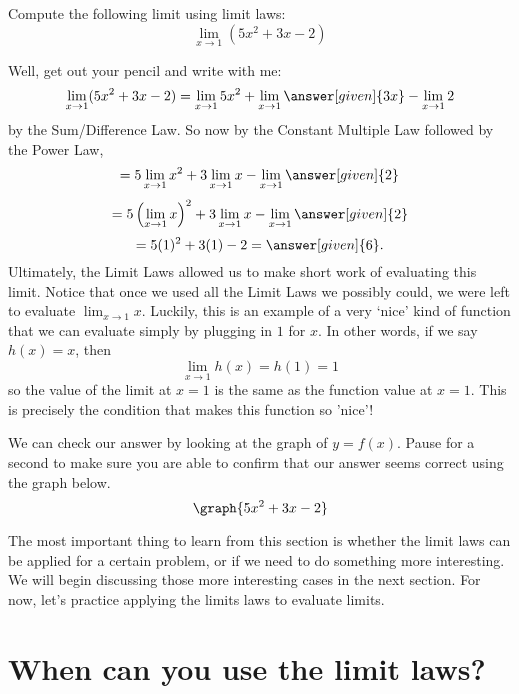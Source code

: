 \documentclass{ximera}
\begin{document}
\begin{example}
  Compute the following limit using limit laws:
  \[
  \displaystyle\lim_{x\to 1}(5x^2+3x-2)
  \]
\begin{explanation}
  Well, get out your pencil and write with me:
  \[
  \displaystyle\lim_{x\to 1} (5x^2+3x-2) = \lim_{x\to 1} 5x^2 + \lim_{x\to 1} \answer[given]{3x} - \lim_{x\to 1}2
  \]
  by the Sum/Difference Law. So now by the Constant Multiple Law followed by the Power Law, 
  \[
  = 5\displaystyle\lim_{x\to 1} x^2 + 3\lim_{x\to 1} x - \lim_{x\to 1}\answer[given]{2}
  \]
   \[
  = 5\left(\displaystyle\lim_{x\to 1} x\right)^2 + 3\lim_{x\to 1} x - \lim_{x\to 1}\answer[given]{2}
  \]
  \[
  = 5(1)^2 + 3(1) - 2 =\answer[given]{6}.
  \]
Ultimately, the Limit Laws allowed us to make short work of evaluating this limit.  Notice that once we used all the Limit Laws we possibly could, we were left to evaluate $\displaystyle\lim_{x\to 1} x$.  Luckily, this is an example of a very `nice' kind of function that we can evaluate simply by plugging in $1$ for $x$.  In other words, if we say $h(x) = x$, then $$\displaystyle\lim_{x\to 1} h(x) = h(1) = 1$$ so the value of the limit at $x=1$ is the same as the function value at $x=1$.  This is precisely the condition that makes this function so 'nice'!  

  \begin{prompt}
    We can check our answer by looking at the graph of $y=f(x)$.  Pause for a second to make sure you are able to confirm that our answer seems correct using the graph below. 
    \[
    \graph{5x^2+3x-2}
    \]
  \end{prompt}
\end{explanation}  
\end{example}


The most important thing to learn from this section is whether the
limit laws can be applied for a certain problem, or if we need to
do something more interesting.  We will begin discussing those more
interesting cases in the next section.  For now, let's practice applying the limits laws to evaluate limits.

\section{When can you use the limit laws?}
\end{document}
